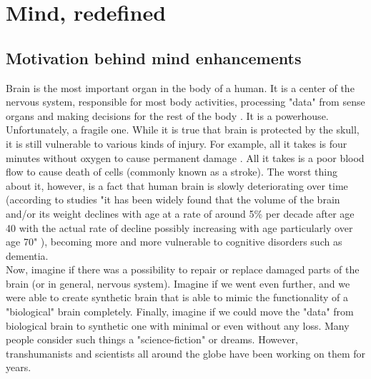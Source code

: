 \documentclass[12pt]{article}
\begin{document}
\section{Mind, redefined}
\subsection{Motivation behind mind enhancements}
	Brain is the most important organ in the body of a human. It is a center of the nervous system, responsible for most body activities, processing "data" from sense organs and making decisions for the rest of the body \cite{humanBrainWiki}. It is a powerhouse. Unfortunately, a fragile one. While it is true that brain is protected by the skull, it is still vulnerable to various kinds of injury. For example, all it takes is four minutes without oxygen to cause permanent damage \cite{lackofoxygen}. All it takes is a poor blood flow to cause death of cells (commonly known as a stroke)\cite{wikipediaStroke}. The worst thing about it, however, is a fact that human brain is slowly deteriorating over time (according to studies "it has been widely found that the volume of the brain and/or its weight declines with age at a rate of around 5\% per decade after age 40 with the actual rate of decline possibly increasing with age particularly over age 70" \cite{brainAging}), becoming more and more vulnerable to cognitive disorders such as dementia.
	\\Now, imagine if there was a possibility to repair or replace damaged parts of the brain (or in general, nervous system). Imagine if we went even further, and we were able to create synthetic brain that is able to mimic the functionality of a "biological" brain completely. Finally, imagine if we could move the "data" from biological brain to synthetic one with minimal or even without any loss. Many people consider such things a "science-fiction" or dreams. However, transhumanists and scientists all around the globe have been working on them for years.
\end{document}
